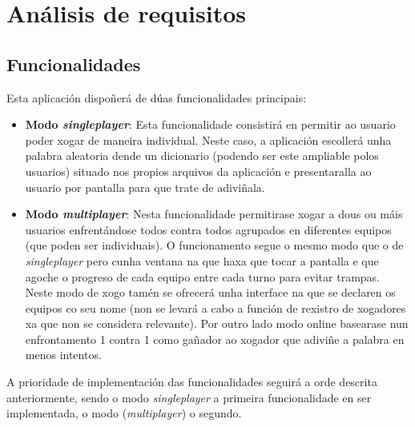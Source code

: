 \chapter{Análisis de requisitos}
\label{chap:requisitos}
\section{Funcionalidades}
Esta aplicación dispoñerá de dúas funcionalidades principais:
\begin{itemize}
    \item \textbf{Modo \textit{singleplayer}}: Esta funcionalidade consistirá en permitir ao usuario poder xogar de maneira individual. Neste caso, a aplicación escollerá unha palabra aleatoria dende un dicionario (podendo ser este ampliable polos usuarios) situado nos propios arquivos da aplicación e presentaralla ao usuario por pantalla para que trate de adiviñala.
    \item \textbf{Modo \textit{multiplayer}}: Nesta funcionalidade permitirase xogar a dous ou máis usuarios enfrentándose todos contra todos agrupados en diferentes equipos (que poden ser individuais). O funcionamento segue o mesmo modo que o de \textit{singleplayer} pero cunha ventana na que haxa que tocar a pantalla e que agoche o progreso de cada equipo entre cada turno para evitar trampas. Neste modo de xogo tamén se ofrecerá unha interface na que se declaren os equipos co seu nome (non se levará a cabo a función de rexistro de xogadores xa que non se considera relevante). Por outro lado modo online basearase nun enfrontamento 1 contra 1 como gañador ao xogador que adiviñe a palabra en menos intentos.
\end{itemize}

A prioridade de implementación das funcionalidades seguirá a orde descrita anteriormente, sendo o modo \textit{singleplayer} a primeira funcionalidade en ser implementada, o modo (\textit{multiplayer}) o segundo. \\

